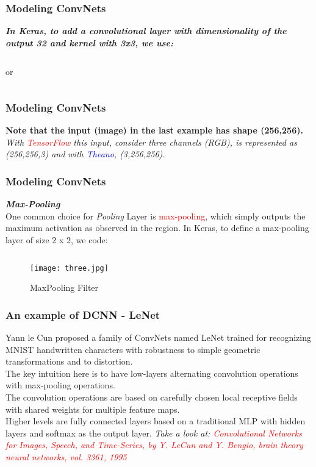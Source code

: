 \documentclass[aspectratio=169]{beamer}
\begin{document}
\begin{frame}
\frametitle{Modeling ConvNets}
\textbf{\emph{In Keras, to add a convolutional layer with dimensionality of the output 32 and kernel with 3x3, we use:}}
\inputminted{python}{twentyfive.py}
or 
\inputminted{python}{twentysix.py}
\end{frame}

\begin{frame}
\frametitle{Modeling ConvNets}
\textbf{Note that the input (image) in the last example has shape (256,256).}
\\[0.3cm]
\emph{With \textcolor{red}{TensorFlow} this input, consider three channels (RGB), is represented as (256,256,3) and with \textcolor{blue}{Theano}, (3,256,256).}
\end{frame}

\begin{frame}
\frametitle{Modeling ConvNets}
\textbf{\emph{Max-Pooling}}
\\[0.1cm]
One  common choice for \emph{Pooling} Layer is \textcolor{red}{max-pooling}, which simply outputs the maximum activation as observed in the region. In Keras, to define a max-pooling layer of size 2 x 2, we code:
\inputminted{python}{twentyseven.py}
\begin{figure}
\texttt{[image: three.jpg]}
\caption{MaxPooling Filter}
\label{fig:MaxPooling Filter- Shaped(2x2)}
\end{figure}
\end{frame}

\begin{frame}
\frametitle{An example of DCNN - LeNet}
Yann le Cun proposed  a family of ConvNets named LeNet trained for recognizing MNIST handwritten characters with robustness to simple geometric transformations and to distortion. 
\\[0.3cm]
The key intuition here is to have low-layers alternating convolution operations with max-pooling operations. 
\\[0.3cm]
The convolution operations are based on carefully chosen local receptive fields with shared weights for multiple feature maps. 
\\[0.3cm]
Higher levels are fully connected layers based on a traditional MLP with hidden layers and softmax as the output layer.
\textit{Take a look at: \textcolor{red}{Convolutional Networks for Images, Speech, and Time-Series, by Y. LeCun and Y. Bengio, brain theory neural networks, vol. 3361, 1995}}
\end{frame}
\end{document}
